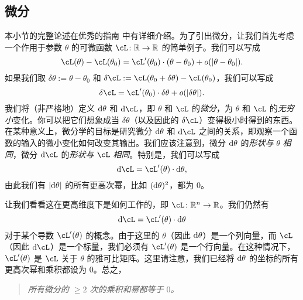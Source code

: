 \documentclass[../../book-main.tex]{subfiles}
\begin{document}
\subsection{微分}

本小节的完整论述在优秀的指南 \cite{bright2025matrix} 中有详细介绍。为了引出微分，让我们首先考虑一个作用于参数 \(\theta\) 的可微函数 \(\cL \colon \R \to \R\) 的简单例子。我们可以写成
\begin{equation}
    \cL(\theta) - \cL(\theta_{0}) = \cL^{\prime}(\theta_{0})\cdot(\theta - \theta_{0}) + o(\abs{\theta - \theta_{0}}).
\end{equation}
如果我们取 \(\delta\theta := \theta - \theta_{0}\) 和 \(\delta\cL := \cL(\theta_{0} + \delta\theta) - \cL(\theta_{0})\)，我们可以写成
\begin{equation}
    \delta\cL = \cL^{\prime}(\theta_{0})\cdot\delta\theta + o(\abs{\delta\theta}).
\end{equation}
我们将（非严格地）定义 \(\odif{\theta}\) 和 \(\odif{\cL}\)，即 \(\theta\) 和 \(\cL\) 的\textit{微分}，为 \(\theta\) 和 \(\cL\) 的\textit{无穷小}变化。你可以把它们想象成当 \(\delta\theta\)（以及因此的 \(\delta \cL\)）变得极小时得到的东西。在某种意义上，微分学的目标是研究微分 \(\odif{\theta}\) 和 \(\odif{\cL}\) 之间的关系，即观察一个函数的输入的微小变化如何改变其输出。我们应该注意到，微分 \(\odif{\theta}\) 的\textit{形状与} \(\theta\) \textit{相同}，微分 \(\odif{\cL}\) 的\textit{形状与} \(\cL\) \textit{相同}。特别是，我们可以写成
\begin{equation}
    \odif{\cL} = \cL^{\prime}(\theta)\cdot\odif{\theta},
\end{equation}
由此我们有 \(\abs{\odif{\theta}}\) 的所有更高次幂，比如 \((\odif{\theta})^{2}\)，都为 \(0\)。

让我们看看这在更高维度下是如何工作的，即 \(\cL \colon \R^{n} \to \R\)。我们仍然有
\begin{equation}
    \odif{\cL} = \cL^{\prime}(\theta)\cdot\odif{\theta}
\end{equation}
对于某个导数 \(\cL^{\prime}(\theta)\) 的概念。由于这里的 \(\theta\)（因此 \(\odif{\theta}\)）是一个列向量，而 \(\cL\)（因此 \(\odif{\cL}\)）是一个标量，我们必须有 \(\cL^{\prime}(\theta)\) 是一个行向量。在这种情况下，\(\cL^{\prime}(\theta)\) 是 \(\cL\) 关于 \(\theta\) 的雅可比矩阵。这里请注意，我们已经将 \(\odif{\theta}\) 的坐标的所有更高次幂和乘积都设为 \(0\)。总之，
\begin{quote}
    \centering
    \textit{所有微分的 \(\geq 2\) 次的乘积和幂都等于 \(0\)。}
\end{quote}
\end{document}
